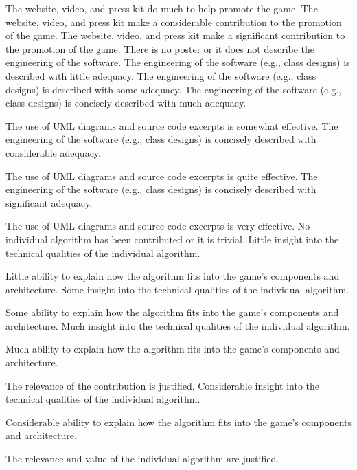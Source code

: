 \documentclass{../fal_assignment}
\begin{document}
\begin{markingrubric}
        \grade The website, video, and press kit do much to help promote the game.
        \grade The website, video, and press kit make a considerable contribution to the promotion of the game.
        \grade The website, video, and press kit make a significant contribution to the promotion of the game.
%
        \grade\fail There is no poster or it does not describe the engineering of the software. 
        \grade The engineering of the software (e.g., class designs) is described with little adequacy.
        \grade The engineering of the software (e.g., class designs) is described with some adequacy.
        \grade The engineering of the software (e.g., class designs) is concisely described with much adequacy.
            \par The use of UML diagrams and source code excerpts is somewhat effective.
        \grade The engineering of the software (e.g., class designs) is concisely described with considerable adequacy.
            \par The use of UML diagrams and source code excerpts is quite effective.
        \grade The engineering of the software (e.g., class designs) is concisely described with significant adequacy.
            \par The use of UML diagrams and source code excerpts is very effective.
%
        \grade\fail No individual algorithm has been contributed or it is trivial.
        \grade Little insight into the technical qualities of the individual algorithm.
            \par Little ability to explain how the algorithm fits into the game's components and architecture.
        \grade Some insight into the technical qualities of the individual algorithm.
            \par Some ability to explain how the algorithm fits into the game's components and architecture.
        \grade Much insight into the technical qualities of the individual algorithm.
            \par Much ability to explain how the algorithm fits into the game's components and architecture.
            \par The relevance of the contribution is justified.
        \grade Considerable insight into the technical qualities of the individual algorithm.
            \par Considerable ability to explain how the algorithm fits into the game's components and architecture.
            \par The relevance and value of the individual algorithm are justified.

\end{markingrubric}
\end{document}
